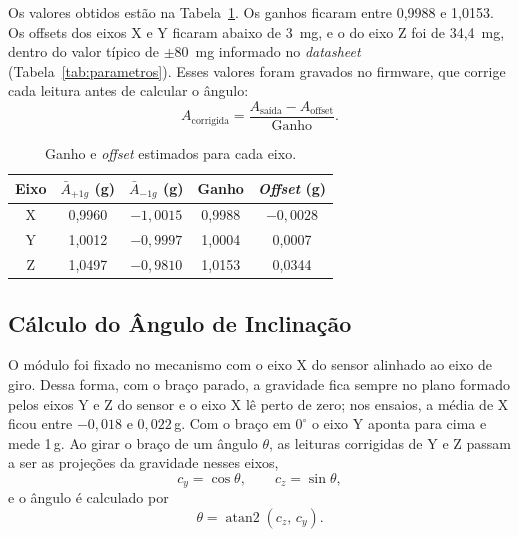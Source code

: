 \documentclass[conference]{IEEEtran}
\begin{document}
Os valores obtidos estão na Tabela~\ref{tab:calibracao}. Os ganhos ficaram entre 0,9988 e 1,0153. Os offsets dos eixos X e Y ficaram abaixo de 3~mg, e o do eixo Z foi de 34,4~mg, dentro do valor típico de $\pm80$~mg informado no \textit{datasheet} (Tabela~\ref{tab:parametros}). Esses valores foram gravados no firmware, que corrige cada leitura antes de calcular o ângulo:
\begin{equation}
	A_{\text{corrigida}} = \frac{A_{\text{saída}} - A_{\text{offset}}}{\text{Ganho}}.
	\label{eq:correcao}
\end{equation}

\begin{table}[!htb]
	\caption{Ganho e \textit{offset} estimados para cada eixo.}
	\label{tab:calibracao}
	\centering
	\renewcommand{\arraystretch}{1.3}
	\begin{tabular}{|c|c|c|c|c|} \hline
		\textbf{Eixo} & $\bar{A}_{+1g}$ (g) & $\bar{A}_{-1g}$ (g) & \textbf{Ganho} & \textbf{\textit{Offset}} (g) \\ \hline
		X & 0{,}9960 & $-1{,}0015$ & 0{,}9988 & $-0{,}0028$ \\ \hline
		Y & 1{,}0012 & $-0{,}9997$ & 1{,}0004 & 0{,}0007 \\ \hline
		Z & 1{,}0497 & $-0{,}9810$ & 1{,}0153 & 0{,}0344 \\ \hline
	\end{tabular}
\end{table}

\subsection{Cálculo do Ângulo de Inclinação}
O módulo foi fixado no mecanismo com o eixo X do sensor alinhado ao eixo de giro. Dessa forma, com o braço parado, a gravidade fica sempre no plano formado pelos eixos Y e Z do sensor e o eixo X lê perto de zero; nos ensaios, a média de X ficou entre $-0{,}018$ e $0{,}022$\,g. Com o braço em $0^\circ$ o eixo Y aponta para cima e mede 1\,g. Ao girar o braço de um ângulo $\theta$, as leituras corrigidas de Y e Z passam a ser as projeções da gravidade nesses eixos,
\begin{equation}
	c_y = \cos\theta, \qquad c_z = \sin\theta,
	\label{eq:projecoes}
\end{equation}
e o ângulo é calculado por
\begin{equation}
	\theta = \operatorname{atan2}(c_z,\, c_y).
	\label{eq:atan2}
\end{equation}
\end{document}
